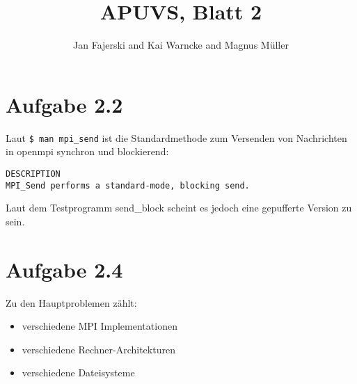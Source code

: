 \documentclass[a4paper,
12pt,
BCOR12mm,
]{scrartcl}
\title{APUVS, Blatt 2}
\author{Jan Fajerski and Kai Warncke and Magnus Müller}
\begin{document}
\maketitle  
\section*{Aufgabe 2.2}
Laut \verb|$ man mpi_send| ist die Standardmethode zum Versenden von Nachrichten in
openmpi synchron und blockierend:
\begin{verbatim}
DESCRIPTION
MPI_Send performs a standard-mode, blocking send.
\end{verbatim}

Laut dem Testprogramm send\_block scheint es jedoch eine gepufferte Version zu sein.

\section*{Aufgabe 2.4}
Zu den Hauptproblemen zählt:
\begin{itemize}
	\item verschiedene MPI Implementationen
	\item verschiedene Rechner-Architekturen
	\item verschiedene Dateisysteme
\end{itemize}

\nocite{*}


\end{document}
